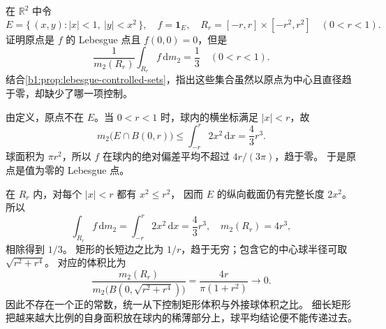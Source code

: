 \begin{exercise}\label{b1:ex:14-degenerate-rectangles}
在 \(\mathbb R^2\) 中令
\[
 E=\{\,(x,y):|x|<1,\ |y|<x^2\,\},\quad f=\mathbf1_E,
 \quad R_r=[-r,r]\times[-r^2,r^2]\quad(0<r<1).
\]
证明原点是 \(f\) 的 Lebesgue 点且 \(f(0,0)=0\)，但是
\[
 \frac1{m_2(R_r)}\int_{R_r}f\,\mathrm dm_2=\frac13
 \quad(0<r<1).
\]
结合\cref{b1:prop:lebesgue-controlled-sets}，指出这些集合虽然以原点为中心且直径趋于零，却缺少了哪一项控制。
\end{exercise}
\begin{solution}
由定义，原点不在 \(E\)。当 \(0<r<1\) 时，球内的横坐标满足 \(|x|<r\)，故
\[
 m_2\bigl(E\cap B(0,r)\bigr)
 \leq\int_{-r}^r2x^2\,\mathrm dx=\frac43r^3.
\]
球面积为 \(\pi r^2\)，所以 \(f\) 在球内的绝对偏差平均不超过 \(4r/(3\pi)\)，趋于零。
于是原点是值为零的 Lebesgue 点。

在 \(R_r\) 内，对每个 \(|x|<r\) 都有 \(x^2\leq r^2\)，
因而 \(E\) 的纵向截面仍有完整长度 \(2x^2\)。所以
\[
 \int_{R_r}f\,\mathrm dm_2=\int_{-r}^r2x^2\,\mathrm dx=\frac43r^3,
 \quad m_2(R_r)=4r^3,
\]
相除得到 \(1/3\)。
矩形的长短边之比为 \(1/r\)，趋于无穷；包含它的中心球半径可取 \(\sqrt{r^2+r^4}\)。
对应的体积比为
\[
 \frac{m_2(R_r)}{m_2\bigl(B(0,\sqrt{r^2+r^4})\bigr)}
 =\frac{4r}{\pi(1+r^2)}\longrightarrow0.
\]
因此不存在一个正的常数，统一从下控制矩形体积与外接球体积之比。
细长矩形把越来越大比例的自身面积放在球内的稀薄部分上，球平均结论便不能传递过去。
\end{solution}

